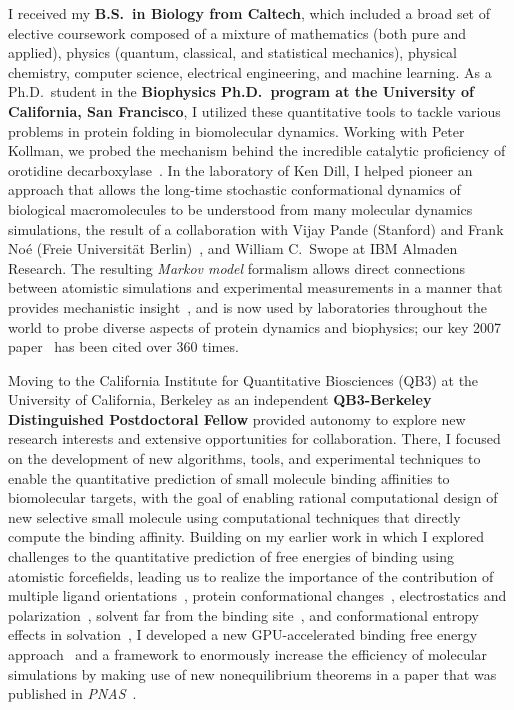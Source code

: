 \documentclass[10pt]{article}
\begin{document}
I received my {\bf B.S.~in Biology from Caltech}, which included a broad set of elective coursework composed of a mixture of mathematics (both pure and applied), physics (quantum, classical, and statistical mechanics), physical chemistry, computer science, electrical engineering, and machine learning.  
As a Ph.D.~student in the {\bf Biophysics Ph.D.~program at the University of California, San Francisco}, I utilized these quantitative tools to tackle various problems in protein folding in biomolecular dynamics.
Working with Peter Kollman, we probed the mechanism behind the incredible catalytic proficiency of orotidine decarboxylase~\cite{lee-chong-chodera-kollman:2001:jacs:odcase}.
In the laboratory of Ken Dill, I helped pioneer an approach that allows the long-time stochastic conformational dynamics of biological macromolecules to be understood from many molecular dynamics simulations, the result of a collaboration with Vijay Pande (Stanford) and Frank No\'{e} (Freie Universit\"{a}t Berlin)~\cite{chodera:2006:mms:long-time-dynamics,chodera:jcp:2007,bacallado:2009:jcp:detailed-balance-constraint,temperature-dependent-markov-models,noe:pnas:2011:dynamical-fingerprints,noe:jcp:2011:msm-review}, and William C.~Swope at IBM Almaden Research.
The resulting \emph{Markov model} formalism allows direct connections between atomistic simulations and experimental measurements in a manner that provides mechanistic insight~\cite{chodera:2006:mms:long-time-dynamics,chodera:jcp:2007}, and is now used by laboratories throughout the world to probe diverse aspects of protein dynamics and biophysics; our key 2007 paper~\cite{chodera:jcp:2007} has been cited over 360 times.

Moving to the California Institute for Quantitative Biosciences (QB3) at the University of California, Berkeley as an independent {\bf QB3-Berkeley Distinguished Postdoctoral Fellow} provided autonomy to explore new research interests and extensive opportunities for collaboration.
There, I focused on the development of new algorithms, tools, and experimental techniques to enable the quantitative prediction of small molecule binding affinities to biomolecular targets, with the goal of enabling rational computational design of new selective small molecule using computational techniques that directly compute the binding affinity.
Building on my earlier work in which I explored challenges to the quantitative prediction of free energies of binding using atomistic forcefields, leading us to realize the importance of the contribution of multiple ligand orientations~\cite{mobley-chodera-dill:2006:jcp:orientation-restraints}, protein conformational changes~\cite{mobley-chodera-dill:2007:jctc:confine-and-release}, electrostatics and polarization~\cite{mobley:jpcb:2007:comparison-of-charge-models}, solvent far from the binding site~\cite{shirts-mobley-chodera-pande:2007:jpcb:dispersion-corrections}, and conformational entropy effects in solvation~\cite{mobley:jpcb:2008:implicit-hydration}, I developed a new GPU-accelerated binding free energy approach~\cite{wang:jcamd:2013:yank} and a framework to enormously increase the efficiency of molecular simulations by making use of new nonequilibrium theorems in a paper that was published in \emph{PNAS}~\cite{ncmc}.
\end{document}
